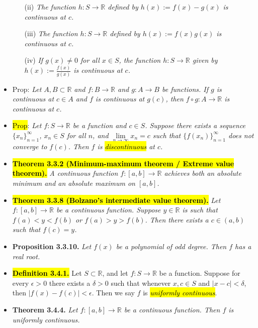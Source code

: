 \documentclass[a4paper,10pt]{article}
\begin{document}
\begin{multicols}{2}
\begin{itemize}
\begin{itemize}
        \item[(ii)] \textit{The function \( h: S \to \mathbb{R} \) defined by \( h(x) := f(x) - g(x) \) is continuous at \( c \).}
        
        \item[(iii)] \textit{The function \( h: S \to \mathbb{R} \) defined by \( h(x) := f(x) g(x) \) is continuous at \( c \).}
        
        \item[(iv)] \textit{If \( g(x) \neq 0 \) for all \( x \in S \), the function \( h: S \to \mathbb{R} \) given by \( h(x) := \frac{f(x)}{g(x)} \) is continuous at \( c \).}
    \end{itemize}
    \item Prop: \textit{Let \( A, B \subset \mathbb{R} \) and \( f: B \to \mathbb{R} \) and \( g: A \to B \) be functions. If \( g \) is continuous at \( c \in A \) and \( f \) is continuous at \( g(c) \), then \( f \circ g: A \to \mathbb{R} \) is continuous at \( c \).}
    \item \hl{Prop}: \textit{Let \( f: S \to \mathbb{R} \) be a function and \( c \in S \). Suppose there exists a sequence \( \{ x_n \}_{n=1}^{\infty} \), \( x_n \in S \) for all \( n \), and \( \lim\limits_{n \to \infty} x_n = c \) such that \( \{ f(x_n) \}_{n=1}^{\infty} \) does not converge to \( f(c) \). Then \( f \) is \hl{discontinuous} at \( c \).}
    \item \hl{\textbf{Theorem 3.3.2 (Minimum-maximum theorem / Extreme value theorem).}} \textit{A continuous function \( f: [a, b] \to \mathbb{R} \) achieves both an absolute minimum and an absolute maximum on \( [a, b] \).}
    \item \hl{\textbf{Theorem 3.3.8 (Bolzano’s intermediate value theorem).}} \textit{Let \( f: [a, b] \to \mathbb{R} \) be a continuous function. Suppose \( y \in \mathbb{R} \) is such that \( f(a) < y < f(b) \) or \( f(a) > y > f(b) \). Then there exists a \( c \in (a, b) \) such that \( f(c) = y \).}
    \item \textbf{Proposition 3.3.10.} \textit{Let \( f(x) \) be a polynomial of odd degree. Then \( f \) has a real root.}
    \item \hl{\textbf{Definition 3.4.1.}} Let \( S \subset \mathbb{R} \), and let \( f: S \to \mathbb{R} \) be a function. Suppose for every \( \epsilon > 0 \) there exists a \( \delta > 0 \) such that whenever \( x, c \in S \) and \( |x - c| < \delta \), then \( |f(x) - f(c)| < \epsilon \). Then we say \( f \) is \hl{\textit{uniformly continuous}}.
    \item \textbf{Theorem 3.4.4.} \textit{Let \( f : [a, b] \to \mathbb{R} \) be a continuous function. Then \( f \) is uniformly continuous.}

\end{itemize}
\end{multicols}
\end{document}
